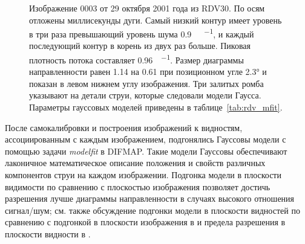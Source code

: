\begin{figure}[tbh]
 \caption{Изображение 0003 от 29 октября 2001 года из RDV30. По осям отложены
миллисекунды дуги. Самый низкий контур имеет уровень в три раза превышающий уровень шума
\SI{0.9}{\milli\jansky\per\beam}, и каждый последующий контур в корень из двух раз больше. Пиковая
плотность потока составляет \SI{0.96}{\jansky\per\beam}. Размер диаграммы направленности
равен 1.14 на \SI{0.61}{\mas} при позиционном угле \ang{2.3} и показан в
левом нижнем углу изображения. Три залитых ромба указывают на детали струи, которые следовали
модели Гаусса. Параметры гауссовых моделей приведены в таблице~\ref{tab:rdv_mfit}.}
 \label{fig:0003}
\end{figure}

После самокалибровки и построения изображений к видностям, ассоциированным с каждым изображением,
подгонялись Гауссовы модели с помощью задачи \emph{modelfit} в DIFMAP. Такие модели Гауссовы
обеспечивают лаконичное математическое описание положения и свойств различных компонентов
струи на каждом изображении. Подгонка модели в плоскости видимости по сравнению с плоскостью
изображения позволяет достичь разрешения лучше диаграммы направленности в случаях высокого
отношения сигнал/шум; см. также обсуждение подгонки модели в плоскости видностей по сравнению с
подгонкой в плоскости изображения в \cite{Lister_2009b} и предела разрешения в плоскости видности
в \cite{Kovalev_2005}.

